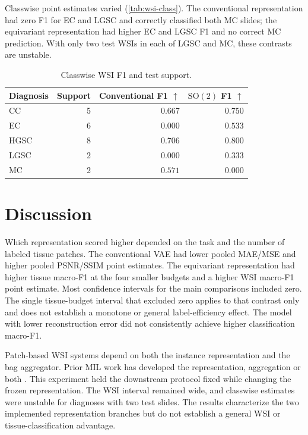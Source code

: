 \documentclass[conference,a4paper]{IEEEtran}
\newcommand{\SOtwo}{\mathrm{SO}(2)}
\begin{document}
Classwise point estimates varied (\autoref{tab:wsi-class}). The conventional
representation had zero F1 for EC and LGSC and correctly classified both MC
slides; the equivariant representation had higher EC and LGSC F1 and no
correct MC prediction. With only two test WSIs in each of LGSC and MC, these
contrasts are unstable.

\begin{table}[t]
\caption{Classwise WSI F1 and test support.}
\label{tab:wsi-class}
\centering
\footnotesize
\begin{tabular}{lrrr}
\toprule
Diagnosis & Support & Conventional F1 $\uparrow$ & $\SOtwo$ F1 $\uparrow$ \\
\midrule
CC & 5 & $0.667$ & $0.750$ \\
EC & 6 & $0.000$ & $0.533$ \\
HGSC & 8 & $0.706$ & $0.800$ \\
LGSC & 2 & $0.000$ & $0.333$ \\
MC & 2 & $0.571$ & $0.000$ \\
\bottomrule
\end{tabular}
\end{table}




\section{Discussion}

Which representation scored higher depended on the task and the number of
labeled tissue patches. The conventional VAE had lower pooled MAE/MSE
and higher pooled PSNR/SSIM point estimates. The equivariant representation had higher tissue
macro-F1 at the four smaller budgets and a higher WSI macro-F1 point estimate.
Most confidence intervals for the main comparisons included zero. The
single tissue-budget interval that excluded zero applies to that contrast only
and does not establish a monotone or general label-efficiency effect. The
model with lower reconstruction error did not consistently achieve higher
classification macro-F1.

Patch-based WSI systems depend on both the instance representation and the bag
aggregator. Prior MIL work has developed the representation, aggregation or
both \cite{ilse_attention_2018,lu_data_2021,li_dualstream_2021,shao_transmil_2021}.
This experiment held the downstream protocol fixed while changing the frozen
representation. The WSI interval remained wide, and classwise estimates were
unstable for diagnoses with two test slides. The results characterize the two
implemented representation branches but do not establish a general WSI or
tissue-classification advantage.
\end{document}
